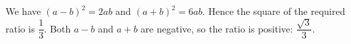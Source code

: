 We have $(a-b)^2=2ab$ and $(a+b)^2=6ab$. Hence the square of the required ratio is $\dfrac{1}{3}$. Both $a-b$ and $a+b$ are negative, so the ratio is positive: $\boxed{\dfrac{\sqrt3}{3}}$.
